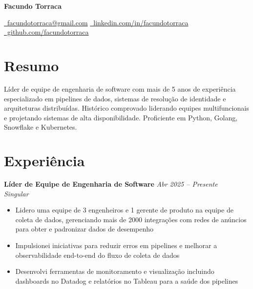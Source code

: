 \documentclass[10pt,a4paper]{article}
\newcommand{\cventry}[3]{%
  \textbf{#1} \hfill \textit{#3}\\[3pt]
  \textit{#2}%
}
\begin{document}
\begin{center}
  {\LARGE\bfseries Facundo Torraca}

  \vspace{0.25cm}

  \href{mailto:facundotorraca@gmail.com}
    {\faEnvelope\ facundotorraca@gmail.com}
  \quad\textperiodcentered\quad
  \href{https://linkedin.com/in/facundotorraca}
    {\faLinkedin\ linkedin.com/in/facundotorraca}
  \quad\textperiodcentered\quad
  \href{https://github.com/facundotorraca}
    {\faGithub\ github.com/facundotorraca}
\end{center}

\section*{Resumo}
Líder de equipe de engenharia de software com mais de 5 anos de experiência
especializado em pipelines de dados, sistemas de resolução de identidade e
arquiteturas distribuídas. Histórico comprovado liderando equipes
multifuncionais e projetando sistemas de alta disponibilidade. Proficiente em
Python, Golang, Snowflake e Kubernetes.

\section*{Experiência}

\cventry{Líder de Equipe de Engenharia de Software}{Singular}{Abr 2025 -- Presente}
\begin{itemize}[leftmargin=*, noitemsep, topsep=3pt, itemsep=2pt]
  \item Lidero uma equipe de 3 engenheiros e 1 gerente de produto na equipe de
        coleta de dados, gerenciando mais de 2000 integrações com redes de
        anúncios para obter e padronizar dados de desempenho
  \item Impulsionei iniciativas para reduzir erros em pipelines e melhorar a
        observabilidade end-to-end do fluxo de coleta de dados
  \item Desenvolvi ferramentas de monitoramento e visualização incluindo
        dashboards no Datadog e relatórios no Tableau para a saúde dos pipelines
\end{itemize}

\vspace{0.25cm}
\end{document}
